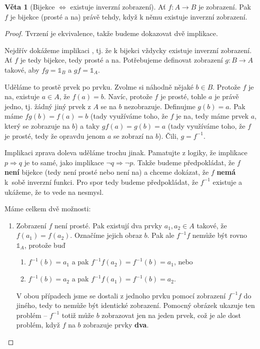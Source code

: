 \documentclass[a4paper,11pt]{article}
\theoremstyle{plain}
\theoremstyle{definition}
\theoremstyle{theorem}
\newtheorem*{theorem}{Věta}
\begin{document}
\begin{theorem}[Bijekce $\iff$ existuje inverzní zobrazení]
 Ať $f:A \to B$ je zobrazení. Pak $f$ je bijekce (prosté a na) právě tehdy, když
 k němu existuje inverzní zobrazení.
\end{theorem}
\begin{proof}
 Tvrzení je ekvivalence, takže budeme dokazovat dvě implikace.

 Nejdřív dokážeme implikaci , tj. že k bijekci vždycky
 existuje inverzní zobrazení. Ať $f$ je tedy bijekce, tedy prosté a na.
 Potřebujeme definovat zobrazení $g:B \to A$ takové, aby $fg = \mathds{1}_{B}$ a
 $gf = \mathds{1}_{A}$.

 Uděláme to prostě prvek po prvku. Zvolme si náhodně nějaké $b \in B$. Protože
 $f$ je na, existuje $a \in A$, že $f(a) = b$. Navíc, protože $f$ je prosté,
 tohle $a$ je právě jedno, tj. žádný jiný prvek z $A$ se na $b$ nezobrazuje.
 Definujme $g(b) = a$. Pak máme $fg(b) = f(a) = b$ (tady využíváme toho, že  $f$ 
 je na, tedy máme prvek $a$, který se zobrazuje na $b$) a taky $gf(a) = g(b) =
 a$ (tady využíváme toho, že $f$ je prosté, tedy že opravdu jenom $a$ se zobrazí
 na $b$). Čili, $g = f^{-1}$.

 Implikaci zprava doleva uděláme trochu jinak. Pamatujte z logiky, že implikace
 $p \Rightarrow q$ je to samé, jako implikace $\neg q \Rightarrow \neg p$. Takže
 budeme předpokládat, že $f$ \textbf{není} bijekce (tedy není prosté nebo není
 na) a chceme dokázat, že $f$ \textbf{nemá} k~sobě inverzní funkci. Pro spor
 tedy budeme předpokládat, že $f^{-1}$ existuje a ukážeme, že to vede na
 nesmysl.

 Máme celkem dvě možnosti:
 \begin{enumerate}[label=(\arabic*),topsep=0pt]
  \item Zobrazení $f$ není prosté. Pak existují dva prvky $a_1,a_2 \in A$
   takové, že $f(a_1) = f(a_2)$. Označíme jejich obraz $b$. Pak ale $f^{-1}f$
   nemůže být rovno $\mathds{1}_{A}$, protože buď
   \begin{enumerate}[label=(\alph*)]
    \item $f^{-1}(b) = a_1$ a pak $f^{-1}f(a_2) = f^{-1}(b) = a_1$, nebo
    \item $f^{-1}(b) = a_2$ a pak $f^{-1}f(a_1) = f^{-1}(b) = a_2$.
   \end{enumerate}
   V obou případech jsme se dostali z jednoho prvku pomocí zobrazení $f^{-1}f$ 
   do jiného, tedy to nemůže být identické zobrazení. Pomocný obrázek ukazuje
   ten problém -- $f^{-1}$ totiž může $b$ zobrazovat jen na jeden prvek, což je
   ale dost problém, když $f$ na $b$ zobrazuje prvky \textbf{dva}.
   \begin{center}
\end{center}
\end{enumerate}
\end{proof}
\end{document}
